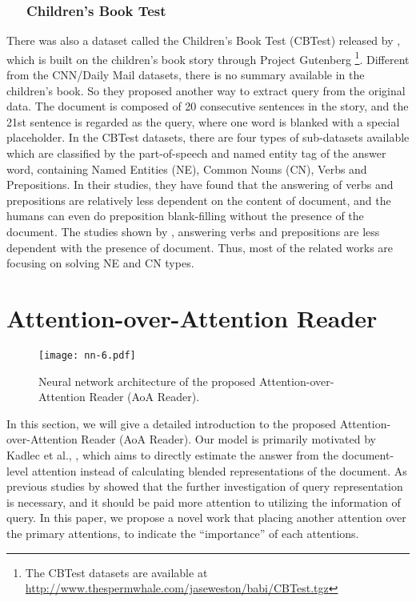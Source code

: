 \documentclass[11pt,a4paper]{article}
\begin{document}
\subsubsection*{~~ Children's Book Test}
There was also a dataset called the Children's Book Test (CBTest) released by , which is built on the children's book story through Project Gutenberg \footnote{The CBTest datasets are available at \url{http://www.thespermwhale.com/jaseweston/babi/CBTest.tgz}}. 
Different from the CNN/Daily Mail datasets, there is no summary available in the children's book. So they proposed another way to extract query from the original data.
The document is composed of 20 consecutive sentences in the story, and the 21st sentence is regarded as the query, where one word is blanked with a special placeholder.
In the CBTest datasets, there are four types of sub-datasets available which are classified by the part-of-speech and named entity tag of the answer word, containing Named Entities (NE), Common Nouns (CN), Verbs and Prepositions. 
In their studies, they have found that the answering of verbs and prepositions are relatively less dependent on the content of document, and the humans can even do preposition blank-filling without the presence of the document.
The studies shown by , answering verbs and prepositions are less dependent with the presence of document. Thus, most of the related works are focusing on solving NE and CN types.

\section{Attention-over-Attention Reader}\label{nn-for-rc}

\begin{figure*}[htbp]
  \centering
  \texttt{[image: nn-6.pdf]}
  \caption{\label{nn-arch} Neural network architecture of the proposed Attention-over-Attention Reader (AoA Reader).}
\end{figure*}

In this section, we will give a detailed introduction to the proposed Attention-over-Attention Reader (AoA Reader).
Our model is primarily motivated by Kadlec et al., , which aims to directly estimate the answer from the document-level attention instead of calculating blended representations of the document. 
As previous studies by  showed that the further investigation of query representation is necessary, and it should be paid more attention to utilizing the information of query.
In this paper, we propose a novel work that placing another attention over the primary attentions, to indicate the ``importance'' of each attentions.
\end{document}
